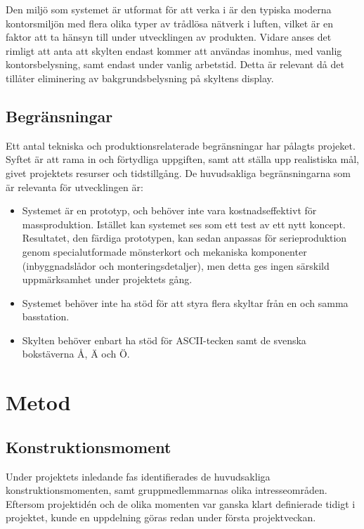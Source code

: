 \documentclass[a4paper,11pt]{article}
\begin{document}
Den miljö som systemet är utformat för att verka i är den typiska moderna kontorsmiljön med flera olika typer av trådlösa nätverk i luften, vilket är en faktor att ta hänsyn till under utvecklingen av produkten. Vidare anses det rimligt att anta att skylten endast kommer att användas inomhus, med vanlig kontorsbelysning, samt endast under vanlig arbetstid. Detta är relevant då det tillåter eliminering av bakgrundsbelysning på skyltens display.

\subsection{Begränsningar}
Ett antal tekniska och produktionsrelaterade begränsningar har pålagts projeket. Syftet är att rama in och förtydliga uppgiften, samt att ställa upp realistiska mål, givet projektets resurser och tidstillgång. De huvudsakliga begränsningarna som är relevanta för utvecklingen är:
	\begin{itemize}
    	\item Systemet är en prototyp, och behöver inte vara kostnadseffektivt för massproduktion. Istället kan systemet ses som ett test av ett nytt koncept. Resultatet, den färdiga prototypen, kan sedan anpassas för serieproduktion genom specialutformade mönsterkort och mekaniska komponenter (inbyggnadslådor och monteringsdetaljer), men detta ges ingen särskild uppmärksamhet under projektets gång.
    	\item Systemet behöver inte ha stöd för att styra flera skyltar från en och samma basstation.
    	\item Skylten behöver enbart ha stöd för ASCII-tecken samt de svenska bokstäverna Å, Ä och Ö.
	\end{itemize}
	
\section{Metod}

\subsection{Konstruktionsmoment}	
Under projektets inledande fas identifierades de huvudsakliga konstruktionsmomenten, samt gruppmedlemmarnas olika intresseområden. Eftersom projektidén och de olika momenten var ganska klart definierade tidigt i projektet, kunde en uppdelning göras redan under första projektveckan.
\end{document}
